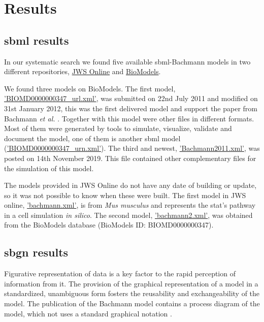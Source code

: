 \section*{Results} \label{sec:resuslt}
\subsection*{\acf{sbml} results}
In our systematic search we found five available \ac{sbml}-Bachmann models in two different repositories, \hyperlink{https://www.systemsmedicine.net/posts/jws-online-biological-systems-modelling}{JWS Online} and \hyperlink{https://www.ebi.ac.uk/biomodels/}{BioModels}.

We found three models on BioModels. The first model, \hyperlink{https://www.ebi.ac.uk/biomodels/model/download/BIOMD0000000347.2?filename=BIOMD0000000347_url.xml}{'BIOMD0000000347\_url.xml'}, was submitted on 22nd July 2011 and modified on 31st January 2012, this was the first delivered model and support the paper from Bachmann \textit{et al.} \cite{bachmannmodel}. Together with this model were other files in different formats. Most of them were generated by tools to simulate, visualize, validate and document the model, one of them is another \ac{sbml} model (\hyperlink{https://www.ebi.ac.uk/biomodels/model/download/BIOMD0000000347.2?filename=BIOMD0000000347_url.xml}{'BIOMD0000000347\_urn.xml'}). The third and newest, \hyperlink{https://www.ebi.ac.uk/biomodels/model/download/BIOMD0000000861.2?filename=Bachmann2011.xml}{'Bachmann2011.xml'}, was posted on 14th November 2019. This file contained other complementary files for the simulation of this model.  

The models provided in JWS Online do not have any date of building or update, so it was not possible to know when these were built. The first model in JWS online, \hyperlink{https://jjj.bio.vu.nl/models/bachmann/sbml/?download=1}{'bachmann.xml'}, is from \textit{Mus musculus} and represents the \ac{stat}'s pathway in a cell simulation \textit{in silico}. The second model, \hyperlink{https://jjj.bio.vu.nl/models/bachmann2/sbml/?download=1}{'bachmann2.xml'}, was obtained from the BioModels database (BioModels ID: BIOMD0000000347).

\subsection*{\acf{sbgn} results}
Figurative representation of data is a key factor to the rapid perception of information from it. The provision of the graphical representation of a model in a standardized, unambiguous form fosters the reusability and exchangeability of the model. The publication of the Bachmann model contains a process diagram of the model, which not uses a standard graphical notation \cite{bachmannmodel}.

